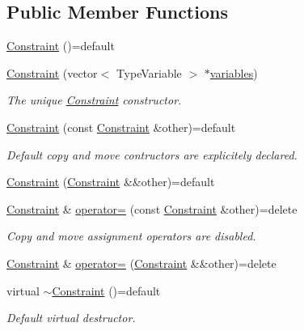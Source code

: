 \subsection*{Public Member Functions}
\begin{DoxyCompactItemize}
\item 
\hyperlink{classghost_1_1Constraint_a7c214f85b51115ef3c32fb21ae90ec22}{Constraint} ()=default
\item 
\hyperlink{classghost_1_1Constraint_afe18954dbdd6fb0524121dc0776eb7f4}{Constraint} (vector$<$ Type\+Variable $>$ $\ast$\hyperlink{classghost_1_1Constraint_a83305933e19440f42428da0726261c4a}{variables})
\begin{DoxyCompactList}\small\item\em The unique \hyperlink{classghost_1_1Constraint}{Constraint} constructor. \end{DoxyCompactList}\item 
\hyperlink{classghost_1_1Constraint_a6c45c0eb8fda1f9b6d807989ec4958d9}{Constraint} (const \hyperlink{classghost_1_1Constraint}{Constraint} \&other)=default
\begin{DoxyCompactList}\small\item\em Default copy and move contructors are explicitely declared. \end{DoxyCompactList}\item 
\hyperlink{classghost_1_1Constraint_a1c2a42013e220dd0de9418d1f45ab902}{Constraint} (\hyperlink{classghost_1_1Constraint}{Constraint} \&\&other)=default
\item 
\hyperlink{classghost_1_1Constraint}{Constraint} \& \hyperlink{classghost_1_1Constraint_a1f5c217b260439b27f2dd0d9b30bdbc7}{operator=} (const \hyperlink{classghost_1_1Constraint}{Constraint} \&other)=delete
\begin{DoxyCompactList}\small\item\em Copy and move assignment operators are disabled. \end{DoxyCompactList}\item 
\hyperlink{classghost_1_1Constraint}{Constraint} \& \hyperlink{classghost_1_1Constraint_af0e96050c719fb50174e90ba14597d51}{operator=} (\hyperlink{classghost_1_1Constraint}{Constraint} \&\&other)=delete
\item 
virtual \hyperlink{classghost_1_1Constraint_aa5d5e4c15ad193621930156edf04bc5f}{$\sim$\+Constraint} ()=default
\begin{DoxyCompactList}\small\item\em Default virtual destructor. \end{DoxyCompactList}\item 

\end{DoxyCompactItemize}
